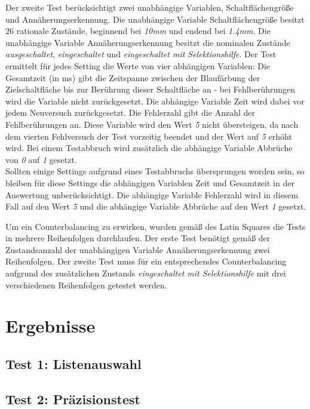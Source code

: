 \documentclass[a4paper,BCOR2mm,12pt,bibliography=totoc,listof=totoc,abstracton]{scrreprt}
\begin{document}
Der zweite Test berücksichtigt zwei unabhängige Variablen, {\ttfamily Schaltflächengröße} und {\ttfamily Annäherungserkennung}. Die unabhängige Variable {\ttfamily Schaltflächengröße} besitzt 26 rationale Zustände, beginnend bei \emph{10mm} und endend bei \emph{1.4mm}. Die unabhängige Variable {\ttfamily Annäherungserkennung} besitzt die nominalen Zustände \emph{ausgeschaltet}, \emph{eingeschaltet} und \emph{eingeschaltet mit Selektionshilfe}. Der Test ermittelt für jedes Setting die Werte von vier abhängigen Variablen: Die {\ttfamily Gesamtzeit} (in ms) gibt die Zeitspanne zwischen der Blaufärbung der Zielschaltfläche bis zur Berührung dieser Schaltfläche an - bei Fehlberührungen wird die Variable nicht zurückgesetzt. Die abhängige Variable {\ttfamily Zeit} wird dabei vor jedem Neuversuch zurückgesetzt. Die {\ttfamily Fehlerzahl} gibt die Anzahl der Fehlberührungen an. Diese Variable wird den Wert \emph{5} nicht übersteigen, da nach dem vierten Fehlversuch der Test vorzeitig beendet und der Wert auf \emph{5} erhöht wird. Bei einem Testabbruch wird zusätzlich die abhängige Variable {\ttfamily Abbrüche} von \emph{0} auf \emph{1} gesetzt.\\
Sollten einige Settings aufgrund eines Testabbruchs übersprungen worden sein, so bleiben für diese Settings die abhängigen Variablen {\ttfamily Zeit} und {\ttfamily Gesamtzeit} in der Auswertung unberücksichtigt. Die abhängige Variable {\ttfamily Fehlerzahl} wird in diesem Fall auf den Wert \emph{5} und die abhängige Variable {\ttfamily Abbrüche} auf den Wert \emph{1} gesetzt.

Um ein Counterbalancing zu erwirken, wurden gemäß des Latin Squares die Tests in mehrere Reihenfolgen durchlaufen. Der erste Test benötigt gemäß der Zustandsanzahl der unabhängigen Variable {\ttfamily Annäherungserkennung} zwei Reihenfolgen. Der zweite Test muss für ein entsprechendes Counterbalancing aufgrund des zusätzlichen Zustands \emph{eingeschaltet mit Selektionshilfe} mit drei verschiedenen Reihenfolgen getestet werden.

\chapter{Ergebnisse}


\section{Test 1: Listenauswahl}


\section{Test 2: Präzisionstest}
\end{document}
